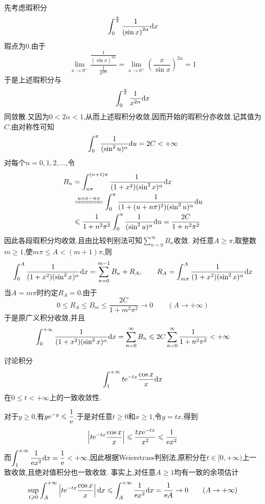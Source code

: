 \documentclass{ctexart}
\begin{document}
\begin{solution}
    先考虑瑕积分
    \[\int_0^{\frac\pi2}\dfrac{1}{\left(\sin x\right)^{2\alpha}}\mathrm{d} x\]
    瑕点为$0$.由于
    \[\lim_{x\to0^+}\dfrac{\frac{1}{\left(\sin x\right)^{2\alpha}}}{\frac{1}{x^{2\alpha}}}=\lim_{x\to0^+}\left(\dfrac{x}{\sin x}\right)^{2\alpha}=1\]
    于是上述瑕积分与
    \[\int_0^{\frac\pi2}\dfrac{1}{x^{2\alpha}}\mathrm{d} x\]
    同敛散.又因为$0<2\alpha<1$,从而上述瑕积分收敛,因而开始的瑕积分亦收敛.记其值为$C$.由对称性可知
    \[\int_0^\pi\dfrac{1}{(\sin^2u)^\alpha}\mathrm{d} u=2C<+\infty\]
    对每个$n=0,1,2,\ldots$,令
    \[\begin{aligned}
        B_n
        &=\int_{n\pi}^{(n+1)\pi}\dfrac{1}{(1+x^2)(\sin^2x)^\alpha}\di x \\
        &\xlongequal{u=x-n\pi}\int_0^\pi\dfrac{1}{(1+(u+n\pi)^2)(\sin^2u)^\alpha}\di u \\
        &\leqslant\dfrac{1}{1+n^2\pi^2}\int_0^\pi\dfrac{1}{(\sin^2u)^\alpha}\di u
        =\dfrac{2C}{1+n^2\pi^2}
    \end{aligned}\]
    因此各段瑕积分均收敛,且由比较判别法可知$\displaystyle\sum_{n=0}^{\infty}B_n$收敛.
    对任意$A\geqslant\pi$,取整数$m\geqslant1$,使$m\pi\leqslant A<(m+1)\pi$,则
    \[\int_0^A\dfrac{1}{(1+x^2)(\sin^2x)^\alpha}\mathrm{d} x
    =\sum_{n=0}^{m-1}B_n+R_A,\qquad
    R_A=\int_{m\pi}^A\dfrac{1}{(1+x^2)(\sin^2x)^\alpha}\mathrm{d} x\]
    当$A=m\pi$时约定$R_A=0$.由于
    \[0\leqslant R_A\leqslant B_m\leqslant\dfrac{2C}{1+m^2\pi^2}\to0\qquad(A\to+\infty)\]
    于是原广义积分收敛,并且
    \[\int_0^{+\infty}\dfrac{1}{(1+x^2)(\sin^2x)^\alpha}\mathrm{d} x
    =\sum_{n=0}^{\infty}B_n
    \leqslant2C\sum_{n=0}^{\infty}\dfrac{1}{1+n^2\pi^2}<+\infty\]
\end{solution}
\begin{problem}[6.(12\songti{分})]
    讨论积分
    \[\int_1^{+\infty}t\mathrm{e}^{-tx}\dfrac{\cos x}{x}\mathrm{d} x\]
    在$0\leqslant t<+\infty$上的一致收敛性.
\end{problem}
\begin{solution}
    对于$y\geqslant0$,有$y\mathrm{e}^{-y}\leqslant\dfrac1{\mathrm{e}}$.于是对任意$t\geqslant0$和$x\geqslant1$,令$y=tx$,得到
    \[\left|t\mathrm{e}^{-tx}\dfrac{\cos x}{x}\right|
    \leqslant\dfrac{tx\mathrm{e}^{-tx}}{x^2}\leqslant\dfrac{1}{\mathrm{e} x^2}\]
    而$\displaystyle\int_1^{+\infty}\dfrac{1}{\mathrm{e} x^2}\mathrm{d} x=\dfrac1{\mathrm{e}}<+\infty$,因此根据Weierstrass判别法,原积分在$t\in[0,+\infty)$上一致收敛,且绝对值积分也一致收敛.
    事实上,对任意$A\geqslant1$均有一致的余项估计
    \[\sup_{t\geqslant0}\int_A^{+\infty}\left|t\mathrm{e}^{-tx}\dfrac{\cos x}{x}\right|\mathrm{d} x
    \leqslant\int_A^{+\infty}\dfrac{1}{\mathrm{e} x^2}\mathrm{d} x=\dfrac{1}{\mathrm{e} A}\to0\qquad(A\to+\infty)\]
\end{solution}
\end{document}
